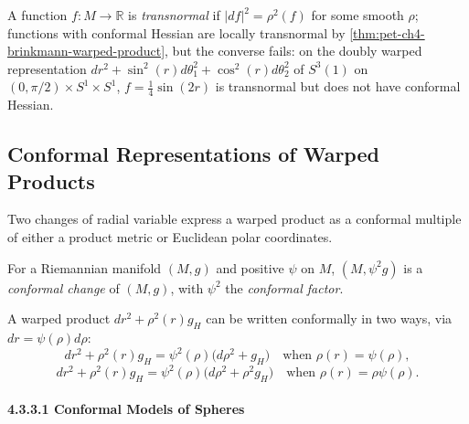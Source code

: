 \begin{remark}
  \label{rem:pet-ch4-transnormal-functions}

  A function $f:M\to\mathbb{R}$ is \emph{transnormal} if $|df|^2=\rho^2(f)$ for some
  smooth $\rho$; functions with conformal Hessian are locally transnormal by
  \cref{thm:pet-ch4-brinkmann-warped-product}, but the converse fails: on the
  doubly warped representation $dr^2+\sin^2(r)d\theta_1^2+\cos^2(r)d\theta_2^2$
  of $S^3(1)$ on $(0,\pi/2)\times S^1\times S^1$, $f=\tfrac14\sin(2r)$ is
  transnormal but does not have conformal Hessian.
\end{remark}

\subsection{Conformal Representations of Warped Products}

Two changes of radial variable express a warped product as a conformal multiple of
either a product metric or Euclidean polar coordinates.

\begin{definition}
  \label{def:pet-ch4-conformal-change}


  For a Riemannian manifold $(M,g)$ and positive $\psi$ on $M$, $(M,\psi^2g)$ is
  a \emph{conformal change} of $(M,g)$, with $\psi^2$ the \emph{conformal
  factor}.
\end{definition}

\begin{definition}
  \label{def:pet-ch4-warped-product-conformal-forms}

  A warped product $dr^2+\rho^2(r)g_H$ can be written conformally in two ways,
  via $dr=\psi(\rho)d\rho$:
  \[
    dr^2+\rho^2(r)g_H=\psi^2(\rho)\big(d\rho^2+g_H\big)\quad\text{when }\rho(r)=\psi(\rho),
  \]
  \[
    dr^2+\rho^2(r)g_H=\psi^2(\rho)\big(d\rho^2+\rho^2g_H\big)\quad\text{when }\rho(r)=\rho\psi(\rho).
  \]
\end{definition}

\paragraph{4.3.3.1 Conformal Models of Spheres}

